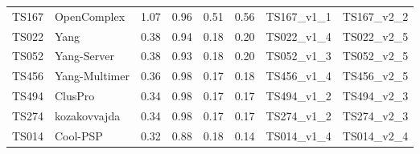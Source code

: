\begin{table}[ht]
{\begin{tabular}{llllllll}
TS167 & OpenComplex & 1.07 & 0.96 & 0.51 & 0.56 & TS167\_v1\_1 & TS167\_v2\_2 \\ 
TS022 & Yang & 0.38 & 0.94 & 0.18 & 0.20 & TS022\_v1\_4 & TS022\_v2\_5 \\ 
TS052 & Yang-Server & 0.38 & 0.93 & 0.18 & 0.20 & TS052\_v1\_3 & TS052\_v2\_5 \\ 
TS456 & Yang-Multimer & 0.36 & 0.98 & 0.17 & 0.18 & TS456\_v1\_4 & TS456\_v2\_5 \\ 
TS494 & ClusPro & 0.34 & 0.98 & 0.17 & 0.17 & TS494\_v1\_2 & TS494\_v2\_3 \\ 
TS274 & kozakovvajda & 0.34 & 0.98 & 0.17 & 0.17 & TS274\_v1\_2 & TS274\_v2\_3 \\ 
TS014 & Cool-PSP & 0.32 & 0.88 & 0.18 & 0.14 & TS014\_v1\_4 & TS014\_v2\_4 \\ 
\bottomrule
\end{tabular}%
}
\end{table}
